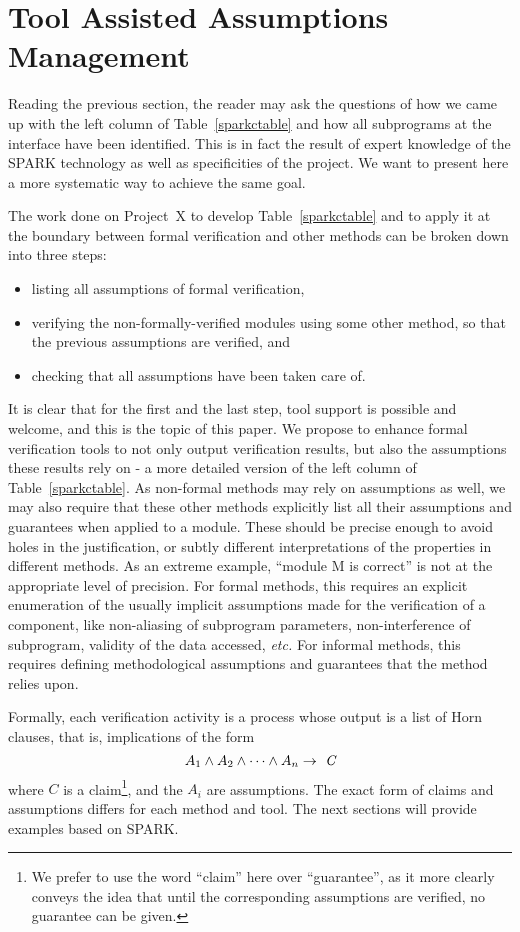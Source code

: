 \documentclass{llncs}
\newcommand{\spark}{SPARK\xspace}
\newcommand{\projectx}{Project~X\xspace}
\newcommand{\etc}{\textit{etc.}\xspace}
\begin{document}
\section{Tool Assisted Assumptions Management}
\label{sec:tool}

Reading the previous section, the reader may ask the questions of how we came up
with the left column of Table~\ref{sparkctable} and how all subprograms at the
interface have been identified. This is in fact the result of expert
knowledge of the \spark technology as well as specificities of
the project. We want to present here a more systematic way to achieve the same goal.

The work done on \projectx to develop Table~\ref{sparkctable} and to apply it
at the boundary between formal verification and other methods can be broken
down into three steps:
\begin{itemize}
   \item listing all assumptions of formal verification,
   \item verifying the non-formally-verified modules using some other method,
     so that the previous assumptions are verified, and
   \item checking that all assumptions have been taken care of.
\end{itemize}

It is clear that for the first and the last step, tool support is possible and
welcome, and this is the topic of this paper. We propose to enhance formal
verification tools to not only output verification results, but also the
assumptions these results rely on - a more detailed version of the
left column of Table~\ref{sparkctable}. As non-formal methods may rely on
assumptions as well, we may also require that these other methods explicitly list
all their assumptions and guarantees when applied to a module. These should be
precise enough to avoid holes in the justification, or subtly different
interpretations of the properties in different methods. As an extreme example,
``module M is correct'' is not at the appropriate level of precision. For
formal methods, this requires an explicit enumeration of the usually implicit
assumptions made for the verification of a component, like non-aliasing of
subprogram parameters, non-interference of subprogram, validity of the data
accessed, \etc For informal methods, this requires defining methodological
assumptions and guarantees that the method relies upon.

Formally, each verification activity is a process whose
output is a list of Horn clauses, that is, implications of the form
\begin{equation*}
   A_1 \wedge A_2 \wedge \dots \wedge A_n \rightarrow\ { \textit C}
\end{equation*}
where $C$ is a claim\footnote{We prefer to use the word ``claim'' here over
``guarantee'', as it more clearly conveys the idea that until the
corresponding assumptions are verified, no guarantee can be given.}, and the
$A_i$ are assumptions. The exact form of claims and assumptions differs for
each method and tool. The next sections will provide examples based on \spark.
\end{document}
